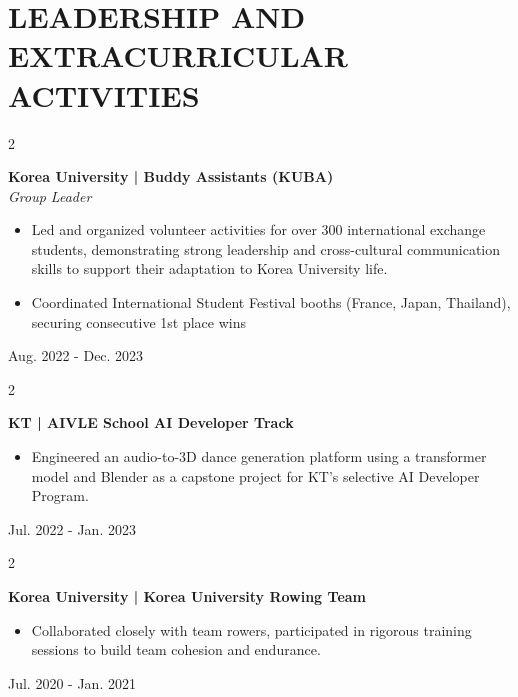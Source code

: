 \documentclass[10pt, letterpaper]{article}
\newenvironment{highlights}{
    \begin{itemize}[
        topsep=0.10 cm,
        parsep=0.10 cm,
        partopsep=0pt,
        itemsep=0pt,
        leftmargin=0 cm + 10pt
    ]
}{
    \end{itemize}
} %
\newenvironment{twocolentry}[2][]{
    \onecolentry
    \def\secondColumn{#2}
    \setcolumnwidth{\fill, 3.5 cm}
    \begin{paracol}{2}
}{
    \switchcolumn \raggedleft \secondColumn
    \end{paracol}
    \endonecolentry
} %
\begin{document}
\section{LEADERSHIP AND EXTRACURRICULAR ACTIVITIES}
        \begin{twocolentry}{
             Aug. 2022 - Dec. 2023\\ 
        }
        \textbf{Korea University | Buddy Assistants (KUBA)}\\
        \textit{Group Leader}
                \begin{highlights}
    \item Led and organized volunteer activities for over 300 international exchange students, demonstrating strong leadership and cross-cultural communication skills to support their adaptation to Korea University life.
    \item Coordinated International Student Festival booths (France, Japan, Thailand), securing consecutive 1st place wins
        \end{highlights}
        \end{twocolentry}

         \vspace{0.2 cm}  

        \begin{twocolentry}{
             Jul. 2022 - Jan. 2023\\ 
        }
        \textbf{KT | AIVLE School AI Developer Track}
        \begin{highlights}
    \item Engineered an audio-to-3D dance generation platform using a transformer model and Blender as a capstone project for KT's selective AI Developer Program.
\end{highlights}
        \end{twocolentry}
         \vspace{0.2 cm}  

        \begin{twocolentry}{
             Jul. 2020 - Jan. 2021\\ 
        }
        \textbf{Korea University | Korea University Rowing Team}
\begin{highlights}
    \item Collaborated closely with team rowers, participated in rigorous training sessions to build team cohesion and endurance.
\end{highlights}
        \end{twocolentry}
         \vspace{0.2 cm}  
\end{document}
